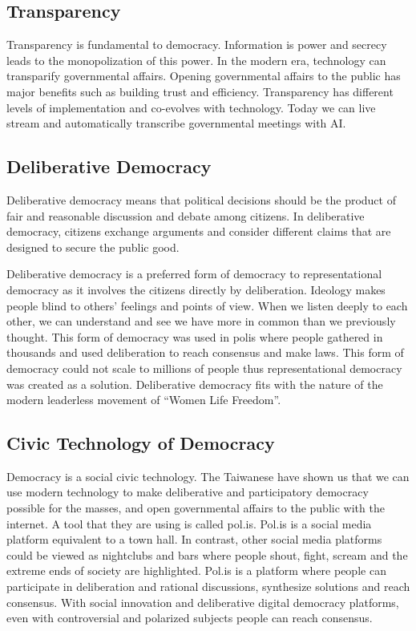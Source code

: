 \documentclass{IEEEtran}
\begin{document}
\begin{enumerate}
\subsection{Transparency}
Transparency is fundamental to democracy. Information is power and secrecy leads to the monopolization of this power. In the modern era, technology can transparify governmental affairs. Opening governmental affairs to the public has major benefits such as building trust and efficiency. Transparency has different levels of implementation and co-evolves with technology. Today we can live stream and automatically transcribe governmental meetings with AI. 

\subsection{Deliberative Democracy}
Deliberative democracy means that political decisions 
should be the product of fair and reasonable discussion and debate among citizens. In deliberative democracy, citizens exchange arguments and consider different claims that are designed to secure the public good. 

Deliberative democracy is a preferred form of democracy to representational democracy as it involves the citizens directly by deliberation. Ideology makes people blind to others' feelings and points of view. When we listen deeply to each other, we can understand and see we have more in common than we previously thought. This form of democracy was used in polis where people gathered in thousands and used deliberation to reach consensus and make laws. This form of democracy could not scale to millions of people thus representational democracy was created as a solution. Deliberative democracy fits with the nature of the modern leaderless movement of “Women Life Freedom”.

\subsection{Civic Technology of Democracy}
Democracy is a social civic technology. The Taiwanese have shown us that we can use modern technology to make deliberative and participatory democracy possible for the masses, and open governmental affairs to the public with the internet. A tool that they are using is called pol.is. Pol.is is a social media platform equivalent to a town hall. In contrast, other social media platforms could be viewed as nightclubs and bars where people shout, fight, scream and the extreme ends of society are highlighted. Pol.is is a platform where people can participate in deliberation and rational discussions, synthesize solutions and reach consensus.
With social innovation and deliberative digital democracy platforms, even with controversial and polarized subjects people can reach consensus.


\end{enumerate}
\end{document}
